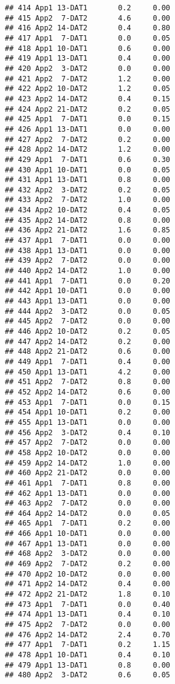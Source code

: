 \documentclass[
]{article}
\begin{document}
\begin{verbatim}
## 414 App1 13-DAT1       0.2     0.00
## 415 App2  7-DAT2       4.6     0.00
## 416 App2 14-DAT2       0.4     0.80
## 417 App1  7-DAT1       0.0     0.05
## 418 App1 10-DAT1       0.6     0.00
## 419 App1 13-DAT1       0.4     0.00
## 420 App2  3-DAT2       0.0     0.00
## 421 App2  7-DAT2       1.2     0.00
## 422 App2 10-DAT2       1.2     0.05
## 423 App2 14-DAT2       0.4     0.15
## 424 App2 21-DAT2       0.2     0.05
## 425 App1  7-DAT1       0.0     0.15
## 426 App1 13-DAT1       0.0     0.00
## 427 App2  7-DAT2       0.2     0.00
## 428 App2 14-DAT2       1.2     0.00
## 429 App1  7-DAT1       0.6     0.30
## 430 App1 10-DAT1       0.0     0.05
## 431 App1 13-DAT1       0.8     0.00
## 432 App2  3-DAT2       0.2     0.05
## 433 App2  7-DAT2       1.0     0.00
## 434 App2 10-DAT2       0.4     0.05
## 435 App2 14-DAT2       0.8     0.00
## 436 App2 21-DAT2       1.6     0.85
## 437 App1  7-DAT1       0.0     0.00
## 438 App1 13-DAT1       0.0     0.00
## 439 App2  7-DAT2       0.0     0.00
## 440 App2 14-DAT2       1.0     0.00
## 441 App1  7-DAT1       0.0     0.20
## 442 App1 10-DAT1       0.0     0.00
## 443 App1 13-DAT1       0.0     0.00
## 444 App2  3-DAT2       0.0     0.05
## 445 App2  7-DAT2       0.0     0.00
## 446 App2 10-DAT2       0.2     0.05
## 447 App2 14-DAT2       0.2     0.00
## 448 App2 21-DAT2       0.6     0.00
## 449 App1  7-DAT1       0.4     0.00
## 450 App1 13-DAT1       4.2     0.00
## 451 App2  7-DAT2       0.8     0.00
## 452 App2 14-DAT2       0.6     0.00
## 453 App1  7-DAT1       0.0     0.15
## 454 App1 10-DAT1       0.2     0.00
## 455 App1 13-DAT1       0.0     0.00
## 456 App2  3-DAT2       0.4     0.10
## 457 App2  7-DAT2       0.0     0.00
## 458 App2 10-DAT2       0.0     0.00
## 459 App2 14-DAT2       1.0     0.00
## 460 App2 21-DAT2       0.0     0.00
## 461 App1  7-DAT1       0.8     0.00
## 462 App1 13-DAT1       0.0     0.00
## 463 App2  7-DAT2       0.0     0.00
## 464 App2 14-DAT2       0.0     0.05
## 465 App1  7-DAT1       0.2     0.00
## 466 App1 10-DAT1       0.0     0.00
## 467 App1 13-DAT1       0.0     0.00
## 468 App2  3-DAT2       0.0     0.00
## 469 App2  7-DAT2       0.2     0.00
## 470 App2 10-DAT2       0.0     0.00
## 471 App2 14-DAT2       0.4     0.00
## 472 App2 21-DAT2       1.8     0.10
## 473 App1  7-DAT1       0.0     0.40
## 474 App1 13-DAT1       0.4     0.10
## 475 App2  7-DAT2       0.0     0.00
## 476 App2 14-DAT2       2.4     0.70
## 477 App1  7-DAT1       0.2     1.15
## 478 App1 10-DAT1       0.4     0.10
## 479 App1 13-DAT1       0.8     0.00
## 480 App2  3-DAT2       0.6     0.05

\end{verbatim}
\end{document}
